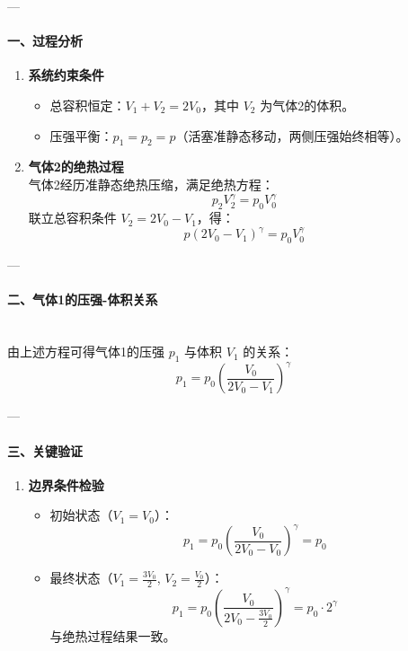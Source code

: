 \documentclass{article}
\begin{document}
{---

\paragraph*{一、过程分析}

\begin{enumerate}
    \item \textbf{系统约束条件}  
    \begin{itemize}
        \item 总容积恒定：\( V_1 + V_2 = 2V_0 \)，其中 \( V_2 \) 为气体2的体积。  
        \item 压强平衡：\( p_1 = p_2 = p \)（活塞准静态移动，两侧压强始终相等）。  
    \end{itemize}

    \item \textbf{气体2的绝热过程}  \\
    气体2经历准静态绝热压缩，满足绝热方程：  
    \[
    p_2 V_2^\gamma = p_0 V_0^\gamma
    \]  
    联立总容积条件 \( V_2 = 2V_0 - V_1 \)，得：  
    \[
    p (2V_0 - V_1)^\gamma = p_0 V_0^\gamma
    \]
\end{enumerate}

---

\paragraph*{二、气体1的压强-体积关系} \mbox{} \\

由上述方程可得气体1的压强 \( p_1 \) 与体积 \( V_1 \) 的关系：  
\[
\boxed{
p_1 = p_0 \left( \frac{V_0}{2V_0 - V_1} \right)^\gamma
}
\]

---

\paragraph*{三、关键验证}

\begin{enumerate}
    \item \textbf{边界条件检验}  
    \begin{itemize}
        \item 初始状态（\( V_1 = V_0 \)）：  
        \[
        p_1 = p_0 \left( \frac{V_0}{2V_0 - V_0} \right)^\gamma = p_0
        \]  
        \item 最终状态（\( V_1 = \frac{3V_0}{2} \), \( V_2 = \frac{V_0}{2} \)）：  
        \[
        p_1 = p_0 \left( \frac{V_0}{2V_0 - \frac{3V_0}{2}} \right)^\gamma = p_0 \cdot 2^\gamma
        \]  
        与绝热过程结果一致。  
    \end{itemize}


\end{enumerate}}
\end{document}
